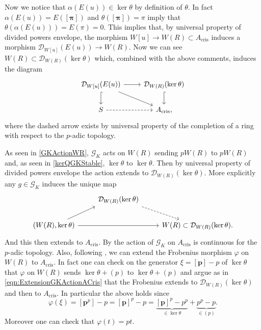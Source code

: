 \begin{rem}[]
	Now we notice that $\alpha(E(u)) \in \ker\theta$
	by definition of $\theta$.
	In fact $\alpha(E(u)) = E(\left[ \boldsymbol\pi \right])$
	and $\theta([\boldsymbol\pi]) = \pi$ imply that $\theta(\alpha(E(u))) = E(\pi) = 0$.
	This implies that, by universal property of divided powers envelope,
	the morphism $W[u] \to W(R) \subset A_{\mathrm{cris}}$
	induces a morphism $\mathcal{D}_{W[u]}(E(u)) \to W(R)$.
	Now we can see $W(R) \subset \mathcal{D}_{W(R)}(\ker\theta)$
	which, combined with the above comments, induces the diagram
	\begin{equation*}
	\begin{tikzcd}
		\mathcal{D}_{W[u]}(E(u)) \arrow[r, "", rightarrow] 
		\arrow[d, "", hookrightarrow] 
		\arrow[rd, "", rightarrow] &
		\mathcal{D}_{W(R)}(\ker\theta) \arrow[d, "", hookrightarrow] \\
		S \arrow[r, "", dashrightarrow] &
		A_{\mathrm{cris}}
	,\end{tikzcd}
	\end{equation*}
	where the dashed arrow exists by universal property of the completion
	of a ring with respect to the $p$-adic topology.
\end{rem}


\begin{rem}[]
	As seen in \cref{GKActionWR}, $\mathscr{G}_K$ acts on $W(R)$ sending $pW(R)$ to $pW(R)$
	and, as seen in \cref{kerQGKStable}, $\ker\theta$ to $\ker\theta$.
	Then by universal property of divided powers envelope the action extends to
	$\mathcal{D}_{W(R)}(\ker\theta)$.
	More explicitly any $g \in \mathscr{G}_K$ induces the unique map
	\begin{equation}\label{eqn:ExtensionGKActionACris}
	\begin{tikzcd}
		&
		\mathcal{D}_{W(R)}(\ker\theta)
		\arrow[rd, "", dashrightarrow,
		start anchor=south east] & \\
		\left(W(R), \ker\theta\right) \arrow[ru, "", rightarrow,
		end anchor=south west] 
		\arrow[rr, "", rightarrow] & &
		W(R) \subset \mathcal{D}_{W(R)}(\ker\theta) 
	.\end{tikzcd}
	\end{equation}
	And this then extends to $A_{\mathrm{cris}}$.
	By {\cite[Proposition 9.1.2]{Brinon}} the action
	of $\mathscr{G}_K$ on $A_{\mathrm{cris}}$ is continuous
	for the $p$-adic topology.
	Also, following {\cite[Lemmas 9.1.7-9.1.8]{Brinon}},
	we can extend the Frobenius morphism $\varphi$ on $W(R)$ to 
	$A_{\mathrm{cris}}$.
	In fact one can check on the generator $\xi = [\mathbf{p}] - p$
	of $\ker \theta$ that $\varphi$ on $W(R)$ sends $\ker\theta + (p)$ to
	$\ker\theta + (p)$ and argue as in \cref{eqn:ExtensionGKActionACris}
	that the Frobenius extends to $\mathcal{D}_{W(R)}(\ker\theta)$
	and then to $A_{\mathrm{cris}}$.
	In particular the above holds since
	\begin{equation*}
		\varphi(\xi) = [\mathbf{p}^p] - p =
		[\mathbf{p}]^p - p =
		\underbrace{[\mathbf{p}]^p - p^p}_{\in \ker\theta} + 
		\underbrace{p^p - p}_{\in (p)}
	.\end{equation*}
	Moreover one can check that $\varphi(t) = pt$.
\end{rem}


